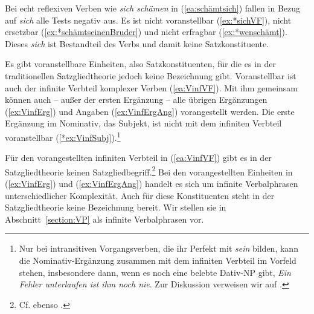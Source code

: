 \ea \label{ea:ReflexivKonstituente}
\label{ea:ReflMF}
\label{ex:ReflVF}
\label{ex:Reflersetzbar}
\label{ex:Reflerfragbar}
\z
\z 

Bei echt reflexiven Verben wie \textit{sich schämen} in (\ref{ea:schämtsich}) fallen in Bezug auf \textit{sich} alle Tests negativ aus. Es ist nicht voranstellbar (\ref{ex:*sichVF}), nicht ersetzbar (\ref{ex:*schämtseinenBruder}) und nicht erfragbar (\ref{ex:*wenschämt}). Dieses \textit{sich} ist Bestandteil des Verbs und damit keine Satzkonstituente.

\ea \label{ea:sich_schämen}
\label{ea:schämtsich}
\label{ex:*sichVF}
\label{ex:*schämtseinenBruder}
\label{ex:*wenschämt}
\z
\z 


Es gibt voranstellbare Einheiten, also Satzkonstituenten, für die es in der traditionellen Satzgliedtheorie jedoch keine Bezeichnung gibt. Voranstellbar ist auch der infinite Verbteil komplexer Verben (\ref{ea:VinfVF}). Mit ihm gemeinsam können auch -- außer der ersten Ergänzung -- alle übrigen Ergänzungen (\ref{ex:VinfErg}) und Angaben (\ref{ex:VinfErgAng}) vorangestellt werden. Die erste Ergänzung im Nominativ, das Subjekt, ist nicht mit dem infiniten Verbteil voranstellbar (\ref{*ex:VinfSubj}).\footnote{Nur bei intransitiven Vorgangsverben, die ihr Perfekt mit \textit{sein} bilden, kann die Nominativ-Ergänzung zusammen mit dem infiniten Verbteil im Vorfeld stehen, insbesondere dann, wenn es noch eine belebte Dativ-NP gibt, \zB \textit{Ein Fehler unterlaufen ist ihm noch nie}. Zur Diskussion verweisen wir auf \citet{Fanselow1992}.} 

\newpage
\ea \label{ea:VPinf}
\label{ea:VinfVF}
\label{ex:VinfErg}
\label{ex:VinfErgAng}
\label{*ex:VinfSubj}
\z 
\z 

Für den vorangestellten infiniten Verbteil in (\ref{ea:VinfVF}) gibt es in der Satzgliedtheorie keinen Satzgliedbegriff.\footnote{Cf. ebenso \citet[89]{Tahiri2022}.} Bei den vorangestellten Einheiten in (\ref{ex:VinfErg}) und (\ref{ex:VinfErgAng}) handelt es sich um infinite Verbalphrasen unterschiedlicher Komplexität. Auch für diese Konstituenten steht in der Satzgliedtheorie keine Bezeichnung bereit. Wir stellen sie in Abschnitt~\ref{section:VP} als infinite Verbalphrasen vor. 

